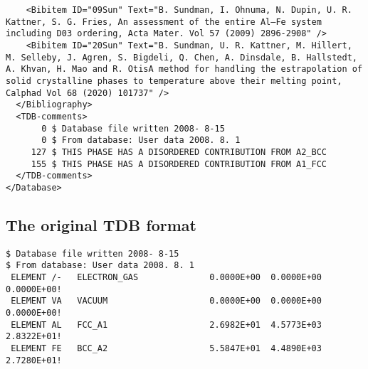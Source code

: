 \documentclass[12pt]{article}
\begin{document}
\begin{appendices}
{\begin{verbatim}
    <Bibitem ID="09Sun" Text="B. Sundman, I. Ohnuma, N. Dupin, U. R. Kattner, S. G. Fries, An assessment of the entire Al–Fe system including D03 ordering, Acta Mater. Vol 57 (2009) 2896-2908" />
    <Bibitem ID="20Sun" Text="B. Sundman, U. R. Kattner, M. Hillert, M. Selleby, J. Agren, S. Bigdeli, Q. Chen, A. Dinsdale, B. Hallstedt, A. Khvan, H. Mao and R. OtisA method for handling the estrapolation of solid crystalline phases to temperature above their melting point, Calphad Vol 68 (2020) 101737" />
  </Bibliography>
  <TDB-comments>
       0 $ Database file written 2008- 8-15
       0 $ From database: User data 2008. 8. 1
     127 $ THIS PHASE HAS A DISORDERED CONTRIBUTION FROM A2_BCC
     155 $ THIS PHASE HAS A DISORDERED CONTRIBUTION FROM A1_FCC
  </TDB-comments>
</Database>
\end{verbatim}
}

\subsection{The original TDB format}

{\small
\begin{verbatim}
$ Database file written 2008- 8-15
$ From database: User data 2008. 8. 1    
 ELEMENT /-   ELECTRON_GAS              0.0000E+00  0.0000E+00  0.0000E+00!
 ELEMENT VA   VACUUM                    0.0000E+00  0.0000E+00  0.0000E+00!
 ELEMENT AL   FCC_A1                    2.6982E+01  4.5773E+03  2.8322E+01!
 ELEMENT FE   BCC_A2                    5.5847E+01  4.4890E+03  2.7280E+01!
 

\end{verbatim}}
\end{appendices}
\end{document}

